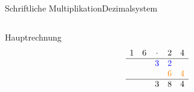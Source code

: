 \documentclass[xelatex,aspectratio=169]{beamer}
\begin{document}
\begin{frame}[t]{Schriftliche Multiplikation}{Dezimalsystem}
  \begin{columns}
    \begin{column}{0.33\textwidth}
      \begin{block}{Hauptrechnung}
        \[
          \begin{matrix}
            1 & 6 & \cdot               & 2                     & 4                     \\
            \hline
              &   & \textcolor{blue}{3} & \textcolor{blue}{2}   &                       \\
              &   &                     & \textcolor{orange}{6} & \textcolor{orange}{4} \\
            \hline
              &   & 3                   & 8                     & 4                     \\
          \end{matrix}
        \]


\end{block}
\end{column}
\end{columns}
\end{frame}
\end{document}
